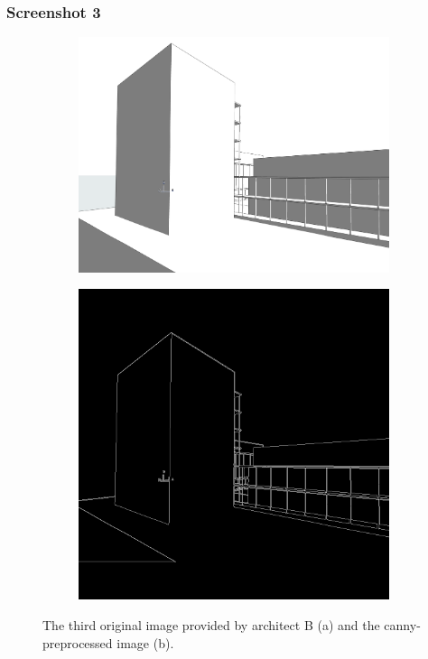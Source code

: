 \subsubsection{Screenshot 3}
\begin{figure}[H]
    \centering
    \begin{subfigure}[b]{0.3\textwidth}
        \centering
        \includegraphics[width=\textwidth]{Images/Results/Architect-B_unstructured-phase/screenshots/screenshot_3.png}
        \caption{}
        \label{A-unstructured-1-sketch}
    \end{subfigure}
    \begin{subfigure}[b]{0.3\textwidth}
        \centering 
        \includegraphics[width=\textwidth]{Images/Results/Architect-B_unstructured-phase/screenshots/screenshot_3_preprocessed.png}
        \caption{}
        \label{A-unstructured-1-sketch-prep}
    \end{subfigure}
    \caption{The third original image provided by architect B (a) and the canny-preprocessed image (b).}
    \label{fig:B-screenshot-3}
\end{figure}

